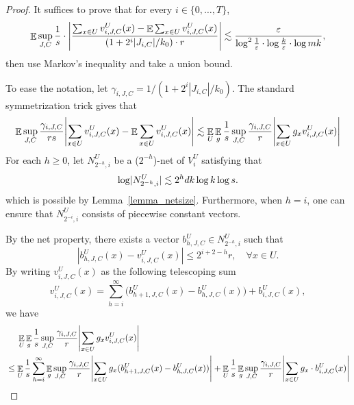 \documentclass[11pt,letterpaper]{article}
\theoremstyle{definition}
\newcommand{\eps}{\varepsilon}
\DeclareMathOperator*{\E}{\ensuremath{\mathbb{E}}}
\DeclarePairedDelimiter{\abs}{\lvert}{\rvert}
\begin{document}
\begin{proof}
It suffices to prove that for every $i\in\{0,\dots,T\}$,
\begin{eqnarray} \label{lemma_chaining_maininq}
    \E\sup_{J,C} \frac{1}{s}\cdot \abs*{ \frac{\sum_{x\in U} v^U_{i,J,C}(x)-\E \sum_{x\in U} v^U_{i,J,C}(x)}{(1+2^i|J_{i,C}|/k_0)\cdot r} }
    \lesssim \frac{\eps}{\log^2 \frac{1}{\eps}\cdot \log \frac{k}{\eps}\cdot \log mk},
\end{eqnarray}
then use Markov's inequality and take a union bound.

To ease the notation, let $\gamma_{i,J,C} = 1/(1+2^i|J_{i,C}|/k_0)$. The standard symmetrization trick gives that
\begin{equation}\label{eqn:chaining_error_symmetrization}
\E\sup_{J,C} \frac{\gamma_{i,J,C}}{rs}  \abs*{ \sum_{x\in U} v^U_{i,J,C}(x)-\E \sum_{x\in U} v^U_{i,J,C}(x) } 
\lesssim
\E_U \E_g \frac{1}{s} \sup_{J,C} \frac{\gamma_{i,J,C}}{r} \abs*{ \sum_{x\in U} g_x v^U_{i,J,C}(x) }
\end{equation}
%
For each $h\geq 0$, let $N_{2^{-h},i}^U$ be a ($2^{-h}$)-net of $V_i^U$ satisfying that
\[
    \log \abs[big]{N_{2^{-h},i}^U} \lesssim 2^h dk \log k \log s.
\]
which is possible by Lemma~\ref{lemma_netsize}. Furthermore, when $h = i$, one can ensure that $N_{2^{-i},i}^U$ consists of piecewise constant vectors.

By the net property, there exists a vector $b_{h,J,C}^U\in N_{2^{-h},i}^U$ such that
\[
|b_{h,J,C}^U(x)-v_{i,J,C}^U(x)|\leq 2^{i+2-h} r,\quad \forall x \in U.
\] 
By writing $v_{i,J,C}^U(x)$ as the following telescoping sum
\[
v_{i,J,C}^U(x)=\sum_{h=i}^{\infty} \big(b_{h+1,J,C}^U(x)-b_{h,J,C}^U(x)\big)+b_{i,J,C}^U(x),
\]
we have
\begin{align}
&\quad\ \E_U \E_g \frac{1}{s} \sup_{J,C} \frac{\gamma_{i,J,C}}{r}\abs*{ \sum_{x\in U} g_x v^U_{i,J,C}(x) } \notag \\
&\leq \E_U \frac{1}{s} \sum_{h=i}^\infty \E_g \sup_{J,C} \frac{\gamma_{i,J,C}}{r} \abs*{\sum_{x\in U} g_x (b_{h+1,J,C}^U(x)-b_{h,J,C}^U(x))} 
+ \E_U\frac{1}{s}\E_g \sup_{J,C} \frac{\gamma_{i,J,C}}{r} \abs*{\sum_{x\in U} g_x \cdot b_{i,J,C}^U(x)} \label{eqn:chaining_error_aux}
\end{align}


\end{proof}
\end{document}
